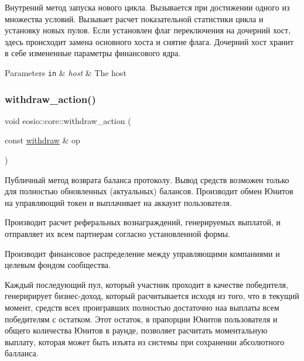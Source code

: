 Внутрений метод запуска нового цикла. Вызывается при достижении одного из множества условий. Вызывает расчет показательной статистики цикла и установку новых пулов. Если установлен флаг переключения на дочерний хост, здесь происходит замена основного хоста и снятие флага. Дочерний хост хранит в себе измененные параметры финансового ядра. 


\begin{DoxyParams}[1]{Parameters}
\mbox{\tt in}  & {\em host} & The host \\
\hline
\end{DoxyParams}
\mbox{\label{structeosio_1_1core_a9de3452f29b79947afee91916eb429eb}} 
\subsubsection{\texorpdfstring{withdraw\+\_\+action()}{withdraw\_action()}}
{\footnotesize\ttfamily void eosio\+::core\+::withdraw\+\_\+action (\begin{DoxyParamCaption}\item[{const \mbox{\hyperlink{structeosio_1_1withdraw}{withdraw}} \&}]{op }\end{DoxyParamCaption})\hspace{0.3cm}{\ttfamily [inline]}}



Публичный метод возврата баланса протоколу. Вывод средств возможен только для полностью обновленных (актуальных) балансов. Производит обмен Юнитов на управляющий токен и выплачивает на аккаунт пользователя. 

Производит расчет реферальных вознаграждений, генерируемых выплатой, и отправляет их всем партнерам согласно установленной формы.

Производит финансовое распределение между управляющими компаниями и целевым фондом сообщества.

Каждый последующий пул, который участник проходит в качестве победителя, генеририрует бизнес-\/доход, который расчитывается исходя из того, что в текущий момент, средств всех проигравших полностью достаточно наа выплаты всем победителям с остатком. Этот остаток, в прапорции Юнитов пользователя и общего количества Юнитов в раунде, позволяет расчитать моментальную выплату, которая может быть изъята из системы при сохранении абсолютного балланса.

